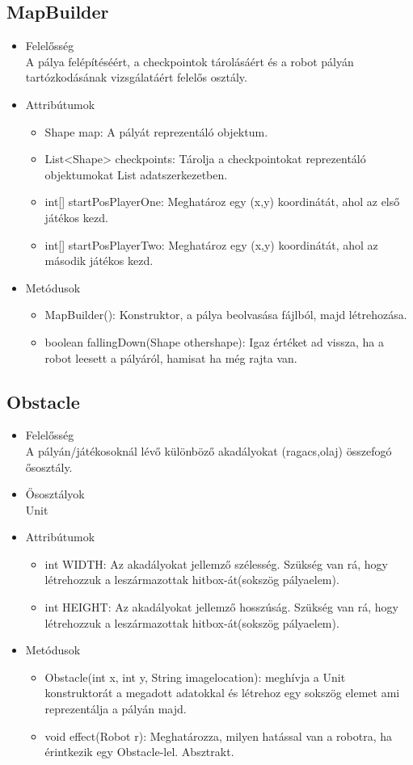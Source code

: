 \subsection{MapBuilder}
\begin{itemize}
\item Felelősség\\
A pálya felépítéséért, a checkpointok tárolásáért és a robot pályán tartózkodásának vizsgálatáért felelős osztály.
\item Attribútumok
	\begin{itemize}
		\item Shape map: A pályát reprezentáló objektum. 
		\item List<Shape> checkpoints: Tárolja a checkpointokat reprezentáló objektumokat List adatszerkezetben.
		\item int[] startPosPlayerOne: Meghatároz egy (x,y) koordinátát, ahol az első játékos kezd.
		\item int[] startPosPlayerTwo: Meghatároz egy (x,y) koordinátát, ahol az második játékos kezd.
	\end{itemize}
\item Metódusok
	\begin{itemize}
		\item MapBuilder(): Konstruktor, a pálya beolvasása fájlból, majd létrehozása.
		\item boolean fallingDown(Shape othershape): Igaz értéket ad vissza, ha a robot leesett a pályáról, hamisat ha még rajta van.
	\end{itemize}
\end{itemize}

\subsection{Obstacle}
\begin{itemize}
\item Felelősség\\
A pályán/játékosoknál lévő különböző akadályokat (ragacs,olaj) összefogó ősosztály.
\item Ősosztályok\\
Unit
\item Attribútumok
	\begin{itemize}
		\item int WIDTH: Az akadályokat jellemző szélesség. Szükség van rá, hogy létrehozzuk a leszármazottak hitbox-át(sokszög pályaelem).
		\item int HEIGHT: Az akadályokat jellemző hosszúság. Szükség van rá, hogy létrehozzuk a leszármazottak hitbox-át(sokszög pályaelem).
	\end{itemize}
\item Metódusok
	\begin{itemize}
		\item Obstacle(int x, int y, String imagelocation): meghívja a Unit konstruktorát a megadott adatokkal és létrehoz egy sokszög elemet ami reprezentálja a pályán majd.
		\item void effect(Robot r): Meghatározza, milyen hatással van a robotra, ha érintkezik egy Obstacle-lel. Absztrakt.
	\end{itemize}
\end{itemize}

